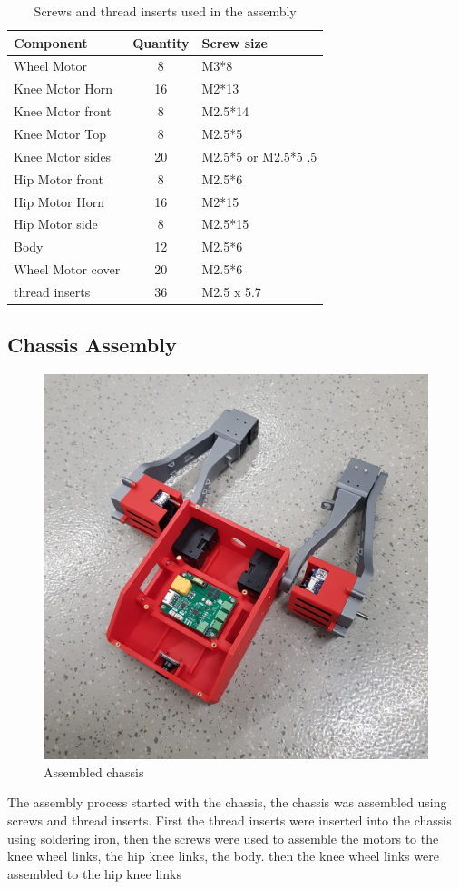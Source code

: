 \begin{table}[h!]
	\centering
	\caption{Screws and thread inserts used in the assembly}
	\label{tab:screws}
	\begin{tabular}{lcl}
		\toprule
		Component & Quantity & Screw size \\
		\midrule
		Wheel Motor & 8 & M3*8 \\
		Knee Motor Horn & 16 & M2*13 \\
		Knee Motor front & 8 & M2.5*14 \\
		Knee Motor Top & 8 & M2.5*5 \\
		Knee Motor sides & 20 & M2.5*5 or M2.5*5 .5 \\
		Hip Motor front & 8 & M2.5*6 \\
		Hip Motor Horn & 16 & M2*15 \\
		Hip Motor side & 8 & M2.5*15 \\
		Body & 12 & M2.5*6 \\
		Wheel Motor cover & 20 & M2.5*6 \\
		thread inserts & 36 & M2.5 x 5.7 \\
		\bottomrule
	\end{tabular}
\end{table}


\subsection{Chassis Assembly}
\begin{figure}[h]
	\centering
	\includegraphics[width=0.5\linewidth]{chassis_assembled}
	\caption{Assembled chassis}
	\label{fig:chassisassembled}
\end{figure}
The assembly process started with the chassis, the chassis was assembled using screws and thread inserts.
First the thread inserts were inserted into the chassis using soldering iron, then the screws were used to assemble the motors to the knee wheel links, the hip knee links, the body.
then the knee wheel links were assembled to the hip knee links

